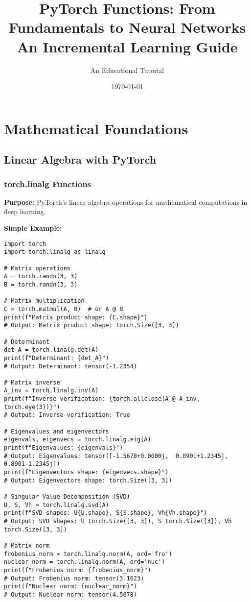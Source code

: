 \documentclass[11pt,a4paper]{book}
\title{PyTorch Functions: From Fundamentals to Neural Networks\\
\large An Incremental Learning Guide}
\author{An Educational Tutorial}
\date{\today}
\begin{document}
\maketitle

\tableofcontents

\chapter{Mathematical Foundations}

\section{Linear Algebra with PyTorch}

\subsection{torch.linalg Functions}

\textbf{Purpose:} PyTorch's linear algebra operations for mathematical computations in deep learning.

\textbf{Simple Example:}
\begin{verbatim}
import torch
import torch.linalg as linalg

# Matrix operations
A = torch.randn(3, 3)
B = torch.randn(3, 3)

# Matrix multiplication
C = torch.matmul(A, B)  # or A @ B
print(f"Matrix product shape: {C.shape}")
# Output: Matrix product shape: torch.Size([3, 3])

# Determinant
det_A = torch.linalg.det(A)
print(f"Determinant: {det_A}")
# Output: Determinant: tensor(-1.2354)

# Matrix inverse
A_inv = torch.linalg.inv(A)
print(f"Inverse verification: {torch.allclose(A @ A_inv, torch.eye(3))}")
# Output: Inverse verification: True

# Eigenvalues and eigenvectors
eigenvals, eigenvecs = torch.linalg.eig(A)
print(f"Eigenvalues: {eigenvals}")
# Output: Eigenvalues: tensor([-1.5678+0.0000j,  0.8901+1.2345j,  0.8901-1.2345j])
print(f"Eigenvectors shape: {eigenvecs.shape}")
# Output: Eigenvectors shape: torch.Size([3, 3])

# Singular Value Decomposition (SVD)
U, S, Vh = torch.linalg.svd(A)
print(f"SVD shapes: U{U.shape}, S{S.shape}, Vh{Vh.shape}")
# Output: SVD shapes: U torch.Size([3, 3]), S torch.Size([3]), Vh torch.Size([3, 3])

# Matrix norm
frobenius_norm = torch.linalg.norm(A, ord='fro')
nuclear_norm = torch.linalg.norm(A, ord='nuc')
print(f"Frobenius norm: {frobenius_norm}")
# Output: Frobenius norm: tensor(3.1623)
print(f"Nuclear norm: {nuclear_norm}")
# Output: Nuclear norm: tensor(4.5678)
\end{verbatim}
\end{document}
